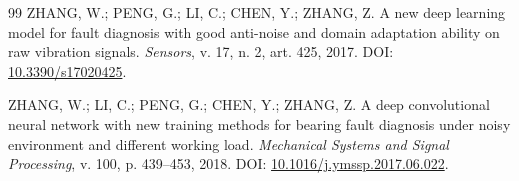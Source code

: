 \documentclass[12pt]{article}
\begin{document}
{\begin{thebibliography}{99}
	ZHANG, W.; PENG, G.; LI, C.; CHEN, Y.; ZHANG, Z.
	\newblock A new deep learning model for fault diagnosis with good anti-noise and domain adaptation ability on raw vibration signals.
	\newblock \emph{Sensors}, v. 17, n. 2, art. 425, 2017.
	\newblock DOI: \href{https://doi.org/10.3390/s17020425}{10.3390/s17020425}.

	ZHANG, W.; LI, C.; PENG, G.; CHEN, Y.; ZHANG, Z.
	\newblock A deep convolutional neural network with new training methods for bearing fault diagnosis under noisy environment and different working load.
	\newblock \emph{Mechanical Systems and Signal Processing}, v. 100, p. 439--453, 2018.
	\newblock DOI: \href{https://doi.org/10.1016/j.ymssp.2017.06.022}{10.1016/j.ymssp.2017.06.022}.

\end{thebibliography}
}
\end{document}
